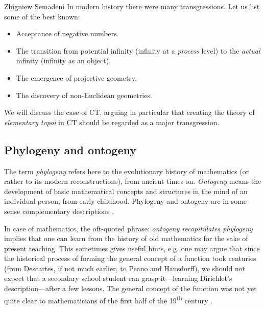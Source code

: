 \begin{artengenv}{Zbigniew Semadeni}
\noindent In modern history there were many transgressions. Let us list some of 
the best known: 

\begin{itemize}
\item Acceptance of negative numbers.
\item The transition from potential infinity (infinity at a \textit{process} 
level) to the \textit{actual} infinity (infinity as an object). 
\item The emergence of projective geometry.  
\item The discovery of non-Euclidean geometries. 
\end{itemize}

\noindent We will discuss the case of CT, arguing in particular that creating the 
theory of \textit{elementary topoi} in CT should be regarded as a major transgression. 

\subsection{Phylogeny and ontogeny}
The term \textit{phylogeny} refers here to the evolutionary history of mathematics 
(or rather to its modern reconstructions), from ancient times on. 
\textit{Ontogeny} means the development of basic mathematical concepts and 
structures in the mind of an individual person, from early childhood. Phylogeny and 
ontogeny are in some sense complementary descriptions \parencites[][]{HF}[][pp.4-29]{P-G}.

In case of mathematics, the oft-quoted phrase: \textit{ontogeny recapitulates 
phylogeny} implies that one can learn from the history of old mathematics for the 
sake of present teaching. This sometimes gives useful hints, e.g. one may argue that 
since the historical process of forming the general concept of a function took 
centuries (from Descartes, if not much earlier, to Peano and Hausdorff), we should 
not expect that a secondary school student can grasp it---learning Dirichlet’s 
description---after a few lessons. The general concept of the function was not 
yet quite clear to mathematicians of the first half of the 19\textsuperscript{th} century 
\parencites[][Appendix 2]{Lakatos}{Youschkevitsch}[][pp.27--30]{Ferreiros}. 


\end{artengenv}
